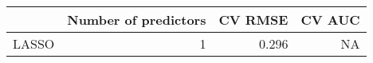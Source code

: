 
\begin{tabular}{lrrr}
\toprule
  & Number of predictors & CV RMSE & CV AUC\\
\midrule
LASSO & 1 & 0.296 & NA\\
\bottomrule
\end{tabular}